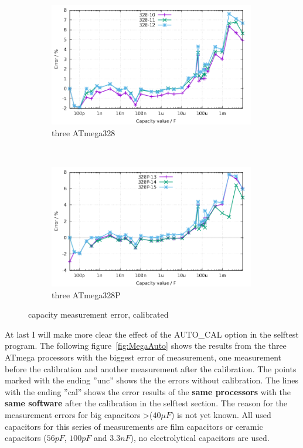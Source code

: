 \begin{figure}[H]
  \begin{subfigure}[b]{9cm}
    \centering
    \includegraphics[width=9cm]{../GNU/Mega328cal.pdf}
    \caption{three ATmega328}
    \label{fig:mega328cal}
  \end{subfigure}
  ~
  \begin{subfigure}[b]{9cm}
    \centering
    \includegraphics[width=9cm]{../GNU/Mega328Pcal.pdf}
    \caption{three ATmega328P}
    \label{fig:mega328Pcal}
  \end{subfigure}
  \caption{capacity measurement error, calibrated}
\end{figure}

At last I will make more clear the effect of the AUTO\_CAL option in the selftest program.
The following figure~\ref{fig:MegaAuto} shows the results from the three ATmega processors
with the biggest error of measurement, one measurement before the calibration and another
measurement after the calibration.
The points marked with the ending ''unc'' shows the the errors without calibration.
The lines with the ending ''cal'' shows the error results of the {\bf same processors} 
with the {\bf same software} after the calibration in the selftest section.
The reason for the measurement errors for big capacitors \textgreater(\(40\mu F\)) is
not yet known. All used capacitors for this series of measurements are film capacitors or
ceramic capacitors (\(56pF\), \(100pF\) and \(3.3nF\)), no electrolytical capacitors are used.

